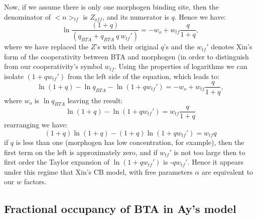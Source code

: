 Now, if we assume there is only one morphogen binding site, then the denominator of $< n >_{tf} $ is $Z_{off}$, and its numerator is $q$.  Hence we have:
\begin{equation}
\ln{\frac{(1+q)}{(q_{BTA} +q_{BTA} \ q \ w_{tf}')}} = -w_o +  w_{tf}\frac{q}{1+q},
\end{equation}
where we have replaced the $Z$'s with their original $q$'s and the $w_{tf}'$ denotes Xin's form of the cooperativity between BTA and morphogen (in order to distinguish from our cooperativity's symbol $w_{tf}$.  Using the properties of logarithms we can isolate $(1+q w_{tf}')$ from the left side of the equation, which leads to:
\begin{equation}
\ln{(1+q)} - \ln{q_{BTA}} - \ln{(1+qw_{tf}')} = -w_o +  w_{tf}\frac{q}{1+q},
\end{equation}
where $w_o$ is $\ln{q_{BTA}}$ leaving the result:
\begin{equation}
\ln{(1+q)} - \ln{(1+qw_{tf}')}=w_{tf}\frac{q}{1+q}
\end{equation}
rearranging we have:
\begin{equation}
(1+q)\ln{(1+q)} - (1+q)\ln{(1+qw_{tf}')}=w_{tf}{q}
\end{equation}
if $q$ is less than one (morphogen has low concentration, for example), then the first term on the left is approximately zero, and if $w_{tf}'$ is not too large then to first order the Taylor expansion of $\ln(1+qw_{tf}')$ is -$qw_{tf}'$.  Hence it appears under this regime that Xin's CB model, with free parameters $\alpha$ are equivalent to our $w$ factors.

\subsection{Fractional occupancy of BTA in Ay's model}

